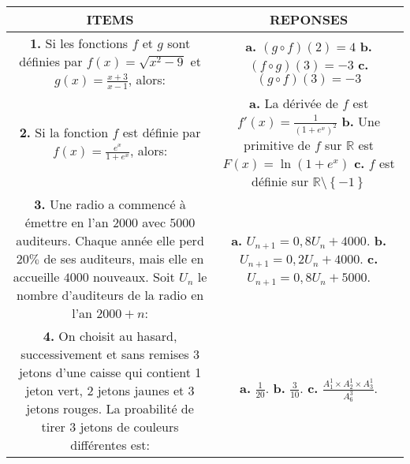 \documentclass[12pt]{article}
\begin{document}
\begin{tabular}{|c|c|}
\hline
\textbf{ITEMS} & \textbf{REPONSES}\\
\hline
\makecell[l]{\textbf{1.} Si les fonctions $f$ et $g$ sont définies par \\ $f(x)=\sqrt{x^{2}-9}$ et $g(x)=\frac{x+3}{x-1}$, alors:} &
\makecell[l]{\textbf{a.} $(g\circ f)(2)=4$ \\ \textbf{b.} $(f\circ g)(3)=-3$ \\ \textbf{c.} $(g\circ f)(3)=-3$}\\
\hline
\makecell[l]{\textbf{2.} Si la fonction $f$ est définie par \\ $f(x)=\frac{e^{x}}{1+e^{x}}$, alors:} &
\makecell[l]{\textbf{a.} La dérivée de $f$ est $f'(x)=\frac{1}{\left(1+e^{x}\right)^{2}}$ \\ \textbf{b.} Une primitive de $f$ sur $\mathbb{R}$ est\\ $F(x)=\ln(1+e^{x})$ \\ \textbf{c.} $f$ est définie sur $\mathbb{R}\setminus\left\lbrace -1\right\rbrace $}\\ 
\hline
\makecell[l]{\textbf{3.} Une radio a commencé à émettre en l'an $2000$\\ avec $5000$ auditeurs. Chaque année elle perd \\ $20\%$ de ses auditeurs, mais elle en accueille $4000$\\ nouveaux. Soit $U_{n}$ le nombre d'auditeurs de la\\ radio en  l'an $2000+n$: } & \makecell[l]{\textbf{a.} $U_{n+1}=0,8U_{n}+4000$. \\ 
\textbf{b.} $U_{n+1}=0,2U_{n}+4000$. \\ \textbf{c.} $U_{n+1}=0,8U_{n}+5000$. }\\
\hline
\makecell[l]{\textbf{4.} On choisit au hasard, successivement et sans\\ remises $3$ jetons d'une caisse qui contient 1 jeton\\ vert, 2 jetons jaunes et 3 jetons rouges.\\ La proabilité de tirer 3 jetons de couleurs différentes est:} & 
\makecell[l]{\textbf{a.} $\frac{1}{20}$. \\ 
\textbf{b.} $\frac{3}{10}$. \\ \textbf{c.} $\frac{ A_{1}^{1}\times A_{2}^{1}\times A_{3}^{1}}{ A_{6}^{3} }$. }\\
\hline
\end{tabular}
\end{document}

